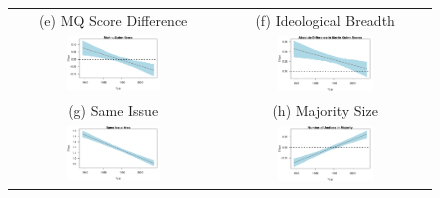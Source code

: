 \documentclass[headsepline=true, abstracton]{scrartcl}
\begin{document}
  \begin{figure}[H]
  \begin{tabular}{cc}
 (e) MQ Score Difference & (f) Ideological Breadth \\
\includegraphics[width = 0.475\textwidth, trim= 0.1cm 1cm 0.5cm .45cm,clip=true]{images/mq_coef_trend_linear.pdf} & \includegraphics[width = 0.475\textwidth, trim= 0.1cm 1cm 0.5cm .45cm,clip=true]{images/absdiffmq_coef_trend_linear.pdf} \\
 
  (g) Same Issue & (h) Majority Size \\
\includegraphics[width = 0.475\textwidth, trim= 0.1cm 1cm 0.5cm .45cm,clip=true]{images/sameissue_coef_trend_linear.pdf} & \includegraphics[width = 0.475\textwidth, trim= 0.1cm 1cm 0.5cm .45cm,clip=true]{images/numberjusticespro_coef_trend_linear.pdf} \\


\end{tabular}
\end{figure}
\end{document}
